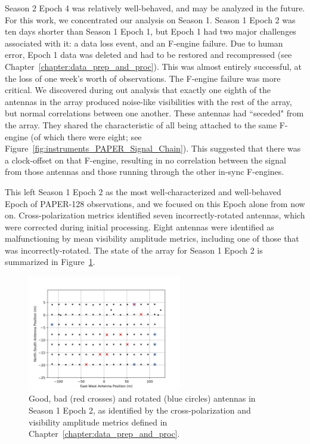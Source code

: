 Season 2 Epoch 4 was relatively well-behaved, and may be analyzed in the future. For this work, we concentrated our analysis on Season 1. Season 1 Epoch 2 was ten days shorter than Season 1 Epoch 1, but Epoch 1 had two major challenges associated with it: a data loss event, and an F-engine failure. Due to human error, Epoch 1 data was deleted and had to be restored and recompressed (see Chapter~\ref{chapter:data_prep_and_proc}). This was almost entirely successful, at the loss of one week's worth of observations. The F-engine failure was more critical. We discovered during out analysis that exactly one eighth of the antennas in the array produced noise-like visibilities with the rest of the array, but normal correlations between one another. These antennas had ``seceded" from the array. They shared the characteristic of all being attached to the same F-engine (of which there were eight; see Figure~\ref{fig:instruments_PAPER_Signal_Chain}). This suggested that there was a clock-offset on that F-engine, resulting in no correlation between the signal from those antennas and those running through the other in-sync F-engines.

This left Season 1 Epoch 2 as the most well-characterized and well-behaved Epoch of PAPER-128 observations, and we focused on this Epoch alone from now on. Cross-polarization metrics identified seven incorrectly-rotated antennas, which were corrected during initial processing. Eight antennas were identified as malfunctioning by mean visibility amplitude metrics, including one of those that was incorrectly-rotated. The state of the array for Season 1 Epoch 2 is summarized in Figure~\ref{fig:s1e2_array}.

\begin{figure}
\centering
\includegraphics[width=0.6\textwidth]{chapters/psa128_pol/figures/s1e2_array.png}
\caption[Good, bad and rotated antennas in Season 1 Epoch 2.]{Good, bad (red crosses) and rotated (blue circles) antennas in Season 1 Epoch 2, as identified by the cross-polarization and visibility amplitude metrics defined in Chapter~\ref{chapter:data_prep_and_proc}.}
\label{fig:s1e2_array}
\end{figure}

